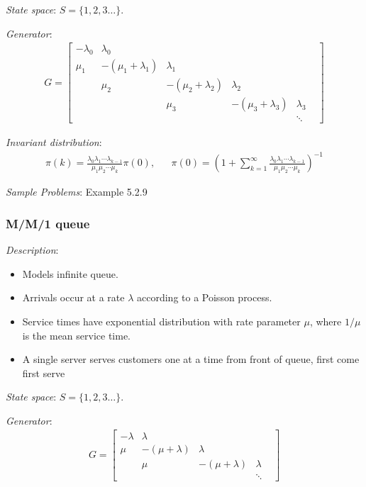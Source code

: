 \documentclass[12pt]{article}
\begin{document}
\textit{State space}: \( S = \{1,2,3\ldots\}  \).

\textit{Generator}:
\begin{align*}
    G = \left[\begin{array}{cccccc}
        -\lambda_0 & \lambda_0 \\
        \mu_1 & -(\mu_1+\lambda_1) & \lambda_1 \\
        & \mu_2 & -(\mu_2+\lambda_2) & \lambda_2 \\
        && \mu_3 & -(\mu_3+\lambda_3) & \lambda_3 \\
        &&&  & \ddots &  
    \end{array}\right]
\end{align*}


\textit{Invariant distribution}:
\begin{align*}
    \pi(k) = \frac{\lambda_0 \lambda_1 \cdots \lambda_{k-1}}{\mu_1 \mu_2 \cdots \mu_k} \pi(0), 
    && \pi(0) = \left( 1+ \sum_{k=1}^{\infty}   \frac{\lambda_0 \lambda_1 \cdots \lambda_{k-1}}{\mu_1 \mu_2 \cdots \mu_k}  \right)^{-1}
\end{align*}


\textit{Sample Problems}: Example 5.2.9



\subsubsection{M/M/1 queue}
\textit{Description}:
\begin{itemize}[nolistsep]
\item Models infinite queue. 
\item Arrivals occur at a rate \( \lambda \) according to a Poisson process. 
\item Service times have exponential distribution with rate parameter \( \mu \), where \( 1/\mu \) is the mean service time.
\item A single server serves customers one at a time from front of queue, first come first serve
\end{itemize}


\textit{State space}: \( S = \{1,2,3\ldots\}  \).

\textit{Generator}:
\begin{align*}
    G = \left[\begin{array}{ccccc}
        -\lambda & \lambda \\
        \mu & -(\mu+\lambda) & \lambda \\
        & \mu & -(\mu+\lambda) & \lambda \\
        &&  & \ddots &  
    \end{array}\right]
\end{align*}
\end{document}
